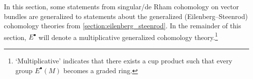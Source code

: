     In this section, some statements from singular/de Rham cohomology on vector bundles are generalized to statements about the generalized (Eilenberg--Steenrod) cohomology theories from \cref{section:eilenberg_steenrod}. In the remainder of this section, $E^\bullet$ will denote a multiplicative generalized cohomology theory.\footnote{`Multiplicative' indicates that there exists a cup product such that every group $E^\bullet(M)$ becomes a graded ring.}

